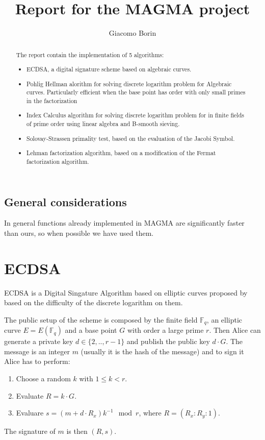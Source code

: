 \documentclass{article}
\title{Report for the MAGMA project}
\author{Giacomo Borin}
\newcommand{\F}{\mathbb{F}}
\theoremstyle{plain}
\theoremstyle{remark}
\theoremstyle{definition}
\begin{document}
\maketitle

\begin{abstract}
	The report contain the implementation of 5 algorithms:
	\begin{itemize}
		\item ECDSA, a digital signature scheme based on algebraic curves.
		\item Pohlig Hellman alorithm for solving discrete logarithm problem for Algebraic curves. Particularly efficient when the base point has order with only small primes in the factorization
		\item Index Calculus algorithm for solving discrete logarithm problem for in finite fields of prime order using linear algebra and B-smooth sieving.
		\item Solovay-Strassen primality test, based on the evaluation of the Jacobi Symbol.
		\item Lehman factorization algorithm, based on a modification of the Fermat factorization algorithm.
	\end{itemize}


\end{abstract}

\subsection*{General considerations}

In general functions already implemented in MAGMA are significantly faster than ours, so when possible we have used them. 


\section{ECDSA}

ECDSA is a Digital Singature Algorithm based on elliptic curves proposed by \cite{ECDSA} based on the difficulty of the discrete logarithm on them. 

The public setup of the scheme is composed by the finite field $\F_q$, an elliptic curve $E = E(\F_q)$ and a base point $G$ with order a large prime $r$. Then Alice can generate a private key $d\in \{2,..,r-1\}$ and publish the public key $d\cdot G$. The message is an integer $m$ (usually it is the hash of the message) and to sign it Alice has to perform:
\begin{enumerate}
	\item Choose a random $k$ with $1 \leq k < r$.
	\item Evaluate $R = k \cdot G$.
	\item Evaluare $ s = (m + d\cdot R_x) k^{-1} \mod r$, where $R = (R_x : R_y : 1)$.
\end{enumerate}
The signature of $m$ is then $(R,s)$.
\end{document}
